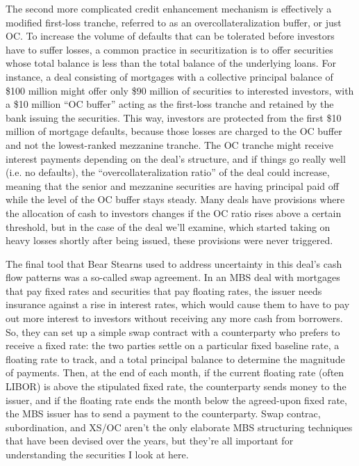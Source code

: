 \documentclass[12pt]{article}
\begin{document}
The second more complicated credit enhancement mechanism is effectively a modified first-loss tranche, referred to as an overcollateralization buffer, or just OC. To increase the volume of defaults that can be tolerated before investors have to suffer losses, a common practice in securitization is to offer securities whose total balance is less than the total balance of the underlying loans. For instance, a deal consisting of mortgages with a collective principal balance of \$100 million might offer only \$90 million of securities to interested investors, with a \$10 million “OC buffer” acting as the first-loss tranche and retained by the bank issuing the securities. This way, investors are protected from the first \$10 million of mortgage defaults, because those losses are charged to the OC buffer and not the lowest-ranked mezzanine tranche. The OC tranche might receive interest payments depending on the deal’s structure, and if things go really well (i.e. no defaults), the “overcollateralization ratio” of the deal could increase, meaning that the senior and mezzanine securities are having principal paid off while the level of the OC buffer stays steady. Many deals have provisions where the allocation of cash to investors changes if the OC ratio rises above a certain threshold, but in the case of the deal we’ll examine, which started taking on heavy losses shortly after being issued, these provisions were never triggered.
	
	The final tool that Bear Stearns used to address uncertainty in this deal's cash flow patterns was a so-called swap agreement. In an MBS deal with mortgages that pay fixed rates and securities that pay floating rates, the issuer needs insurance against a rise in interest rates, which would cause them to have to pay out more interest to investors without receiving any more cash from borrowers. So, they can set up a simple swap contract with a counterparty who prefers to receive a fixed rate: the two parties settle on a particular fixed baseline rate, a floating rate to track, and a total principal balance to determine the magnitude of payments. Then, at the end of each month, if the current floating rate (often LIBOR) is above the stipulated fixed rate, the counterparty sends money to the issuer, and if the floating rate ends the month below the agreed-upon fixed rate, the MBS issuer has to send a payment to the counterparty. Swap contrac, subordination, and XS/OC aren’t the only elaborate MBS structuring techniques that have been devised over the years, but they’re all important for understanding the securities I look at here.
\end{document}
